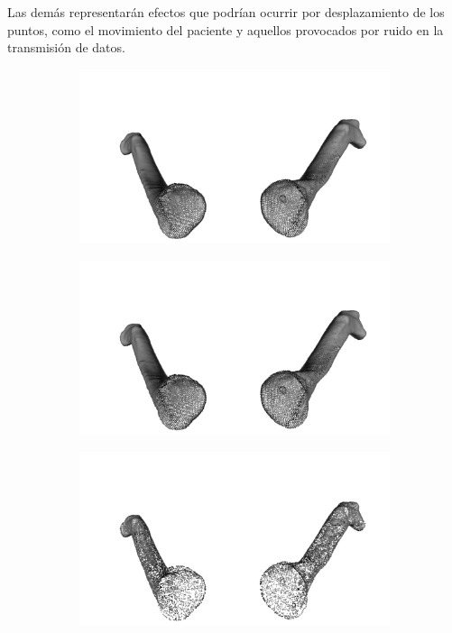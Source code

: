Las demás representarán efectos que podrían ocurrir por desplazamiento de los puntos, 
como el movimiento del paciente y aquellos provocados por ruido en la transmisión de datos.

\begin{figure}[htp]
  \begin{subfigure}[b]{.5\textwidth}
    \centering
    \includegraphics[width=\textwidth]{imagenes/chapter2/clavicula/clavicula_0.png}
  \end{subfigure}
  \hfill
  \begin{subfigure}[b]{.5\textwidth}
    \centering
    \includegraphics[width=\textwidth]{imagenes/chapter2/clavicula/clavicula_1.png}
  \end{subfigure}
  \begin{subfigure}[b]{.5\textwidth}
    \centering
    \includegraphics[width=\textwidth]{imagenes/chapter2/clavicula/clavicula_2.png}

\end{subfigure}
\end{figure}
